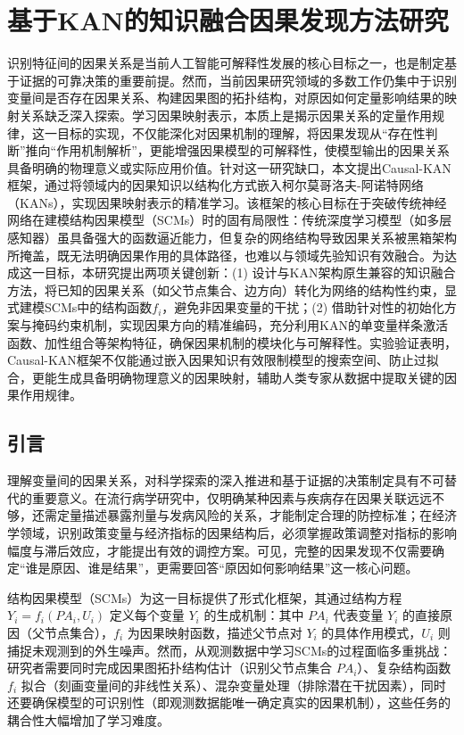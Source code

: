 \chapter{基于KAN的知识融合因果发现方法研究}
识别特征间的因果关系是当前人工智能可解释性发展的核心目标之一，也是制定基于证据的可靠决策的重要前提。然而，当前因果研究领域的多数工作仍集中于识别变量间是否存在因果关系、构建因果图的拓扑结构，对原因如何定量影响结果的映射关系缺乏深入探索。学习因果映射表示，本质上是揭示因果关系的定量作用规律，这一目标的实现，不仅能深化对因果机制的理解，将因果发现从“存在性判断”推向“作用机制解析”，更能增强因果模型的可解释性，使模型输出的因果关系具备明确的物理意义或实际应用价值。针对这一研究缺口，本文提出Causal-KAN框架，通过将领域内的因果知识以结构化方式嵌入柯尔莫哥洛夫-阿诺特网络（KANs），实现因果映射表示的精准学习。该框架的核心目标在于突破传统神经网络在建模结构因果模型（SCMs）时的固有局限性：传统深度学习模型（如多层感知器）虽具备强大的函数逼近能力，但复杂的网络结构导致因果关系被黑箱架构所掩盖，既无法明确因果作用的具体路径，也难以与领域先验知识有效融合。为达成这一目标，本研究提出两项关键创新：(1) 设计与KAN架构原生兼容的知识融合方法，将已知的因果关系（如父节点集合、边方向）转化为网络的结构性约束，显式建模SCMs中的结构函数$f_i$，避免非因果变量的干扰；(2) 借助针对性的初始化方案与掩码约束机制，实现因果方向的精准编码，充分利用KAN的单变量样条激活函数、加性组合等架构特征，确保因果机制的模块化与可解释性。实验验证表明，Causal-KAN框架不仅能通过嵌入因果知识有效限制模型的搜索空间、防止过拟合，更能生成具备明确物理意义的因果映射，辅助人类专家从数据中提取关键的因果作用规律。

\section{引言}

理解变量间的因果关系，对科学探索的深入推进和基于证据的决策制定具有不可替代的重要意义。在流行病学研究中，仅明确某种因素与疾病存在因果关联远远不够，还需定量描述暴露剂量与发病风险的关系，才能制定合理的防控标准；在经济学领域，识别政策变量与经济指标的因果结构后，必须掌握政策调整对指标的影响幅度与滞后效应，才能提出有效的调控方案。可见，完整的因果发现不仅需要确定“谁是原因、谁是结果”，更需要回答“原因如何影响结果”这一核心问题。

结构因果模型（SCMs）为这一目标提供了形式化框架，其通过结构方程 $Y_i = f_i(PA_i, U_i)$ 定义每个变量 $Y_i$ 的生成机制：其中 $PA_i$ 代表变量 $Y_i$ 的直接原因（父节点集合），$f_i$ 为因果映射函数，描述父节点对 $Y_i$ 的具体作用模式，$U_i$ 则捕捉未观测到的外生噪声。然而，从观测数据中学习SCMs的过程面临多重挑战：研究者需要同时完成因果图拓扑结构估计（识别父节点集合 $PA_i$）、复杂结构函数 $f_i$ 拟合（刻画变量间的非线性关系）、混杂变量处理（排除潜在干扰因素），同时还要确保模型的可识别性（即观测数据能唯一确定真实的因果机制），这些任务的耦合性大幅增加了学习难度。

